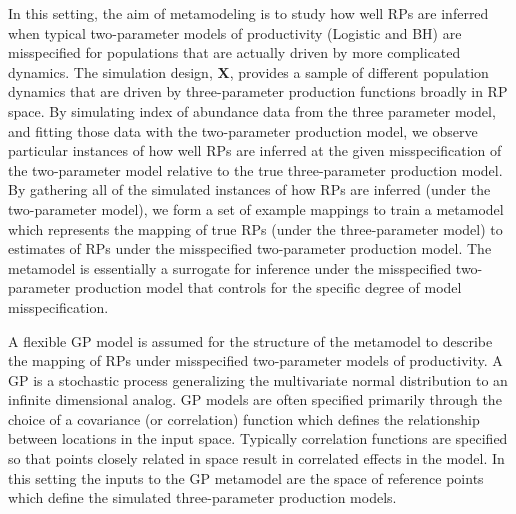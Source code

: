 %
In this setting, the aim of metamodeling is to study how well RPs are inferred
when typical two-parameter models of productivity (Logistic and BH) are
misspecified for populations that are actually driven by more complicated
dynamics. The simulation design, $\bm{X}$, provides a sample of different
population dynamics that are driven by three-parameter production functions
broadly in RP space. By simulating index of abundance data from the three
parameter model, and fitting those data with the two-parameter production model, we %
observe particular instances of how well RPs are inferred at the given
misspecification of the two-parameter model relative to the true three-parameter
production model. By gathering all of the simulated instances of how RPs are
inferred (under the two-parameter model), %
we form a set of example mappings to train a metamodel which represents the
mapping of true RPs (under the three-parameter model) to estimates of RPs under the
misspecified two-parameter production model. The metamodel is essentially a surrogate
for inference under the misspecified two-parameter production model that
controls for the specific degree of model misspecification.

%
A flexible GP model is assumed for the structure of the metamodel to describe the mapping
of RPs under misspecified two-parameter models of productivity. A GP is a
stochastic process generalizing the multivariate normal distribution
to an infinite dimensional analog. GP models are often specified primarily
through the choice of a covariance (or correlation) function which defines the
relationship between locations in the input space. %
Typically correlation functions are specified so that points closely related in
space result in correlated effects in the model. In this setting the inputs to
the GP metamodel are the space of reference points which define the simulated
three-parameter production models.

